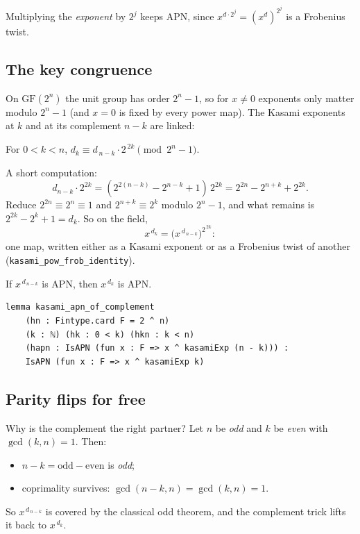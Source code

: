 \documentclass[11pt]{article}
\begin{document}
\noindent
Multiplying the \emph{exponent} by $2^j$ keeps APN, since
$x^{d \cdot 2^j} = (x^{d})^{2^j}$ is a Frobenius twist.

\subsection{The key congruence}

On $\mathrm{GF}(2^n)$ the unit group has order $2^n-1$, so for $x\neq 0$
exponents only matter modulo $2^n-1$ (and $x=0$ is fixed by every power
map). The Kasami exponents at $k$ and at its complement $n-k$ are linked:

\begin{lemma}
For $0 < k < n$, \;$d_k \equiv d_{\,n-k}\cdot 2^{\,2k} \pmod{2^{n}-1}$.
\end{lemma}

\noindent
A short computation:
\[
  d_{n-k}\cdot 2^{2k}
  = (2^{2(n-k)}-2^{n-k}+1)\,2^{2k}
  = 2^{2n}-2^{n+k}+2^{2k} .
\]
Reduce $2^{2n}\equiv 2^n\equiv 1$ and $2^{n+k}\equiv 2^k$ modulo
$2^n-1$, and what remains is $2^{2k}-2^k+1 = d_k$. So on the field,
\[
  x^{\,d_k} = \big(x^{\,d_{\,n-k}}\big)^{2^{\,2k}} :
\]
one map, written either as a Kasami exponent or as a Frobenius twist of
another (\texttt{kasami\_pow\_frob\_identity}).

\begin{lemma}
If $x^{\,d_{\,n-k}}$ is APN, then $x^{\,d_k}$ is APN.
\end{lemma}

\begin{lstlisting}
lemma kasami_apn_of_complement
    (hn : Fintype.card F = 2 ^ n)
    (k : ℕ) (hk : 0 < k) (hkn : k < n)
    (hapn : IsAPN (fun x : F => x ^ kasamiExp (n - k))) :
    IsAPN (fun x : F => x ^ kasamiExp k)
\end{lstlisting}

\subsection{Parity flips for free}

Why is the complement the right partner? Let $n$ be \emph{odd} and $k$ be
\emph{even} with $\gcd(k,n)=1$. Then:
\begin{itemize}
  \item $n-k = \text{odd}-\text{even}$ is \emph{odd};
  \item coprimality survives: $\gcd(n-k,n)=\gcd(k,n)=1$.
\end{itemize}
So $x^{\,d_{\,n-k}}$ is covered by the classical odd theorem, and the
complement trick lifts it back to $x^{\,d_k}$.
\end{document}
